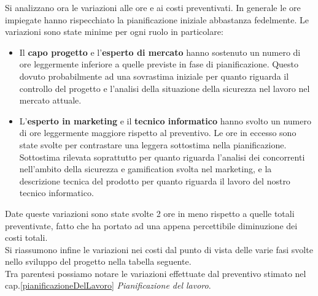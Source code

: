 Si analizzano ora le variazioni alle ore e ai costi preventivati. In generale le ore impiegate hanno rispecchiato la pianificazione iniziale abbastanza fedelmente. Le variazioni sono state minime per ogni ruolo in particolare:

\begin{itemize}
	\item Il \textbf{capo progetto} e l'\textbf{esperto di mercato} hanno sostenuto un numero di ore leggermente inferiore a quelle previste in fase di pianificazione. Questo dovuto probabilmente ad una sovrastima iniziale per quanto riguarda il controllo del progetto e l'analisi della situazione della sicurezza nel lavoro nel mercato attuale.
	\item L'\textbf{esperto in marketing} e il \textbf{tecnico informatico} hanno svolto un numero di ore leggermente maggiore rispetto al preventivo. Le ore in eccesso sono state svolte per contrastare una leggera sottostima nella pianificazione.\\ Sottostima rilevata soprattutto per quanto riguarda l'analisi dei concorrenti nell'ambito della sicurezza e gamification svolta nel marketing, e la descrizione tecnica del prodotto per quanto riguarda il lavoro del nostro tecnico informatico.
\end{itemize}

Date queste variazioni sono state svolte 2 ore in meno rispetto a quelle totali preventivate, fatto che ha portato ad una appena percettibile diminuzione dei costi totali.\\

Si riassumono infine le variazioni nei costi dal punto di vista delle varie fasi svolte nello sviluppo del progetto nella tabella seguente.\\ Tra parentesi possiamo notare le variazioni effettuate dal preventivo stimato nel cap.\ref{pianificazioneDelLavoro} \textit{Pianificazione del lavoro}.


